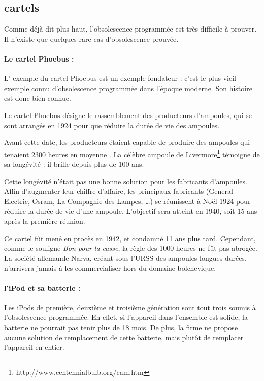 \subsection{cartels}



Comme déjà dit plus haut, l'obsolescence programmée est très difficile à prouver. Il n'existe que quelques rare cas d'obsolescence prouvée. 

\paragraph*{Le cartel Phoebus : } L' exemple du cartel Phoebus est un exemple fondateur : c'est le plus vieil exemple connu d'obsolescence programmée dans l'époque moderne. Son histoire est donc bien connue. 

Le cartel Phoebus désigne le rassemblement des producteurs d'ampoules, qui se sont arrangés en 1924 pour que réduire la durée de vie des ampoules. 

Avant cette date, les producteurs étaient capable de produire des ampoules qui tenaient 2300 heures en moyenne \cite{opes_PHOEBUS}. La célèbre ampoule de Livermore\footnote{http://www.centennialbulb.org/cam.htm} témoigne de sa longévité : il brille depuis plus de 100 ans. 

Cette longévité n'était pas une bonne solution pour les fabricants d'ampoules. Affin d'augmenter leur chiffre d'affaire,  les principaux fabricants (General Electric, Osram, La Compagnie des Lampes, \dots) se réunissent à Noël 1924 pour réduire la durée de vie d'une ampoule. L'objectif sera atteint  en 1940, soit 15 ans après la première réunion. 

Ce cartel fût mené en procès en 1942, et condamné 11 ans plus tard. Cependant, comme le souligne \textit{Bon pour la casse}, la règle des 1000 heures ne fût pas abrogée. La société allemande Narva, créant sous l'URSS des ampoules longues durées, n'arrivera jamais à les commercialiser hors du domaine bolchevique. 

\paragraph*{l'iPod et sa batterie : } Les iPods de première, deuxième et troisième génération sont tout trois soumis à l'obsolescence programmée. En effet, si l'appareil dans l'ensemble est solide, la batterie ne pourrait pas tenir plus de 18 mois. De plus, la firme ne propose aucune solution de remplacement de cette batterie, mais plutôt de remplacer l'appareil en entier. 


